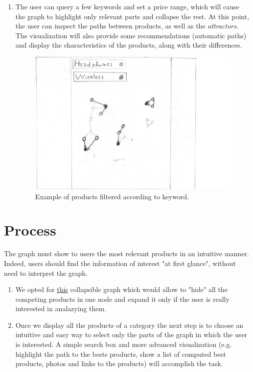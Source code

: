 \documentclass[a4paper,12pt]{article}
\begin{document}
\begin{enumerate}
\begin{figure}[H]
		\label{fig:graph}
	\end{figure}
	\item The user can query a few keywords and set a price range, which will cause the graph to highlight only relevant parts and collapse the rest. At this point, the user can inspect the paths between products, as well as the \emph{attractors}. The visualization will also provide some recommendations (automatic paths) and display the characteristics of the products, along with their differences.
		\begin{figure}[H]
		\centering{}
		\includegraphics[width=\textwidth]{img/wireless.png}
		\caption{Example of products filtered according to keyword.}
		\label{fig:wireless}
	\end{figure}
\end{enumerate}
\section{Process}
The graph must show to users the most relevant products in an intuitive manner. Indeed, users should find the information of interest "at first glance", without need to interpret the graph.
\begin{enumerate}
	\item We opted for \href{http://bl.ocks.org/GerHobbelt/3071239}{this} collapsible graph which would allow to "hide" all the competing products in one node and expand it only if the user is really interested in analazying them. 
	\item Once we display all the products of a category the next step is to choose an intuitive and easy way to select only the parts of the graph in which the user is interested. A simple search box and more advanced visualization (e.g. highlight the path to the bests products, show a list of computed best products, photos and links to the products) will accomplish the task.
\end{enumerate}
 
\end{document}
